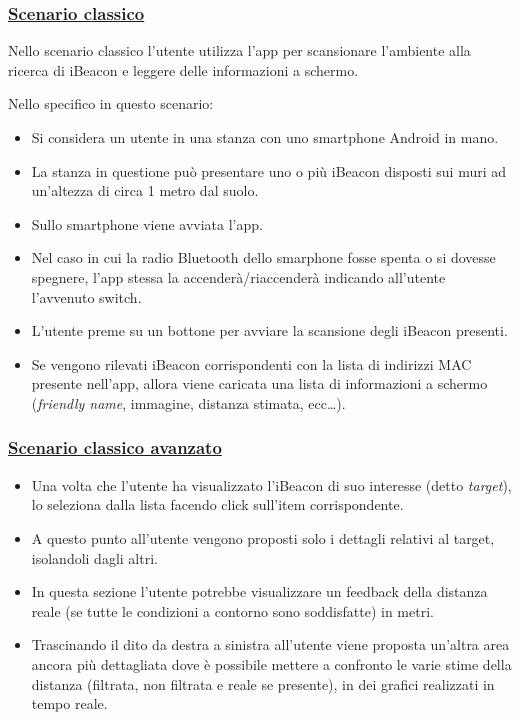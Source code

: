 \subsubsection{\underline{Scenario classico}}
Nello scenario classico l'utente utilizza l'app per scansionare l'ambiente alla ricerca di iBeacon e leggere delle informazioni a schermo.

Nello specifico in questo scenario:
\begin{itemize}
	\item Si considera un utente in una stanza con uno smartphone Android in mano.
	
	\item La stanza in questione può presentare uno o più iBeacon disposti sui muri ad un'altezza di circa 1 metro dal suolo.
	
	\item Sullo smartphone viene avviata l'app.
	
	\item Nel caso in cui la radio Bluetooth dello smarphone fosse spenta o si dovesse spegnere, l'app stessa la accenderà/riaccenderà indicando all'utente l'avvenuto switch.
	
	\item L'utente preme su un bottone per avviare la scansione degli iBeacon presenti.
	
	\item Se vengono rilevati iBeacon corrispondenti con la lista di indirizzi MAC presente nell'app, allora viene caricata una lista di informazioni a schermo (\textit{friendly name}, immagine, distanza stimata, ecc\dots).
\end{itemize}

\subsubsection{\underline{Scenario classico avanzato}}
\begin{itemize}
	\item Una volta che l'utente ha visualizzato l'iBeacon di suo interesse (detto \textit{target}), lo seleziona dalla lista facendo click sull'item corrispondente.
	
	\item A questo punto all'utente vengono proposti solo i dettagli relativi al target, isolandoli dagli altri.
	
	\item In questa sezione l'utente potrebbe visualizzare un feedback della distanza reale (se tutte le condizioni a contorno sono soddisfatte) in metri.
	
	\item Trascinando il dito da destra a sinistra all'utente viene proposta un'altra area ancora più dettagliata dove è possibile mettere a confronto le varie stime della distanza (filtrata, non filtrata e reale se presente), in dei grafici realizzati in tempo reale.
\end{itemize}
